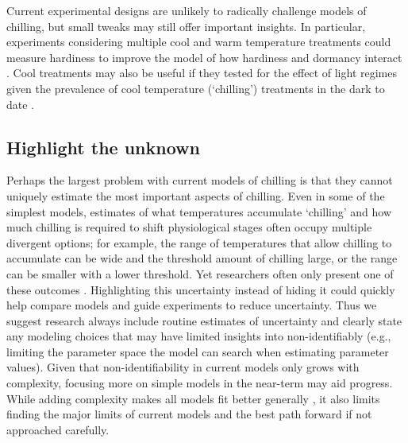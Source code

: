 \documentclass[11pt]{article}
\begin{document}
Current experimental designs are unlikely to radically challenge models of chilling, but small tweaks may still offer important insights. In particular, experiments considering multiple cool and warm temperature treatments could measure hardiness to improve the model of how hardiness and dormancy interact \citep{kovaleskipreprint}. Cool treatments may also be useful if they tested for the effect of light regimes given the prevalence of cool temperature (`chilling') treatments in the dark to date \citep{ospreebbms}. 

\subsection*{Highlight the unknown} 
Perhaps the largest problem with current models of chilling is that they cannot uniquely estimate the most important aspects of chilling. Even in some of the simplest models, estimates of what temperatures accumulate `chilling' and how much chilling is required to shift physiological stages often occupy multiple divergent options; for example, the range of temperatures that allow chilling to accumulate can be wide and the threshold amount of chilling large, or the range can be smaller with a lower threshold. Yet researchers often only present one of these outcomes \citep{chuine2016}.
Highlighting this uncertainty instead of hiding it could quickly help compare models and guide experiments to reduce uncertainty. Thus we suggest research always include routine estimates of uncertainty and clearly state any modeling choices that may have limited insights into non-identifiably 
(e.g., limiting the parameter space the model can search when estimating parameter values). Given that non-identifiability in current models only grows with complexity, focusing more on simple models in the near-term may aid progress. While adding complexity makes all models fit better generally \citep{statrethink}, it also limits finding the major limits of current models and the best path forward if not approached carefully. 
\end{document}
